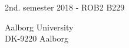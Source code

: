 \begin{titlepage}
\begin{tabular}{@{}p{\textwidth}@{}}
    \vspace{0.2cm}\\
    \midrule
    \toprule[2pt]
  \end{tabular}
  \vspace{7 cm}
  \begin{center}
    {\large
      2nd. semester 2018 - ROB2 B229%
    }\\
    \vspace{1cm}
    {\Large
    }
  \end{center}
  \vfill
  \begin{center}
  Aalborg University\\
  DK-9220 Aalborg
  \end{center}
\end{titlepage}
\clearpage
